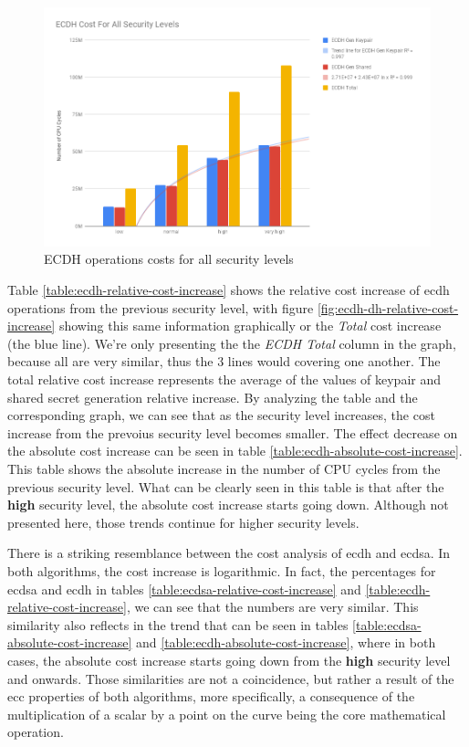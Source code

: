 \documentclass{llncs}
\begin{document}
\begin{figure}
  \centering
  \includegraphics[width=1.0\textwidth]{img/ecdh_cost_all_sls.png}
  \centering \caption{\label{fig:ecdh-costs-all-sls} ECDH operations costs for all security levels}
\end{figure}

Table \ref{table:ecdh-relative-cost-increase} shows the relative cost increase of \gls{ecdh} operations from the previous security
level, with figure \ref{fig:ecdh-dh-relative-cost-increase} showing this same information graphically or the \textit{Total} cost increase (the blue line).
We're only presenting the the \textit{ECDH Total} column in the graph, because all are very similar, thus the $3$ lines would covering one another.
The total relative cost increase represents the average of the values of keypair and shared secret generation relative increase.
By analyzing the table and the corresponding graph, we can see  that as the security level increases, the cost increase  from the prevoius security
level becomes smaller. The effect decrease on the absolute cost increase can be seen in table \ref{table:ecdh-absolute-cost-increase}.
This table shows the absolute increase in the number of CPU cycles from
the previous security level. What can be clearly seen in this table is that after the \textbf{high} security level, the absolute cost increase starts
going down. Although not presented here, those trends continue for higher security levels.

There is a striking resemblance between the cost analysis of \gls{ecdh} and \gls{ecdsa}. In both algorithms, the cost increase is logarithmic.
In fact, the percentages for \gls{ecdsa} and \gls{ecdh} in tables \ref{table:ecdsa-relative-cost-increase}
and \ref{table:ecdh-relative-cost-increase}, we can see that the numbers are very similar. This similarity also reflects in the
trend that can be seen in tables \ref{table:ecdsa-absolute-cost-increase} and \ref{table:ecdh-absolute-cost-increase}, where in both cases, the
absolute cost increase starts going down from the \textbf{high} security level and onwards. Those similarities are not a coincidence, but rather
a result of the \gls{ecc} properties of both algorithms, more specifically, a consequence of the multiplication of a scalar by a point on
the curve being the core mathematical operation.
\end{document}
